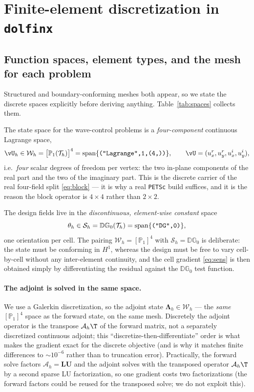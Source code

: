 \section{Finite-element discretization in \texttt{dolfinx}}
\label{sec:fem}

\subsection{Function spaces, element types, and the mesh for each problem}
\label{sec:spaces}
Structured and boundary-conforming meshes both appear, so we state the discrete
spaces explicitly before deriving anything. Table~\ref{tab:spaces}
collects them.

The state space for the wave-control problems is a \emph{four-component}
continuous Lagrange space,
\begin{equation}
  \vU_h\in\mathcal W_h=\bigl[\mathbb P_1(\mathcal T_h)\bigr]^4
  =\operatorname{span}\{\text{\texttt{("Lagrange",1,(4,))}}\},
  \qquad
  \vU=(u_x^r,u_y^r,u_x^i,u_y^i),
  \label{eq:Wspace}
\end{equation}
i.e.\ \emph{four} scalar degrees of freedom per vertex: the two in-plane
components of the real part and the two of the imaginary part. This is the
discrete carrier of the real four-field split \eqref{eq:block} --- it is why a
real \texttt{PETSc} build suffices, and it is the reason the block operator is
$4\times4$ rather than $2\times2$.

The design fields live in the \emph{discontinuous, element-wise constant} space
\begin{equation}
  \theta_h\in\mathcal S_h=\mathbb{DG}_0(\mathcal T_h)
  =\operatorname{span}\{\text{\texttt{("DG",0)}}\},
\end{equation}
one orientation per cell. The pairing
$\mathcal W_h=[\mathbb P_1]^4$ with $\mathcal S_h=\mathbb{DG}_0$ is deliberate:
the state must be conforming in $H^1$, whereas the design must be free to vary
cell-by-cell without any inter-element continuity, and the cell gradient
\eqref{eq:sens} is then obtained simply by differentiating the residual against
the $\mathbb{DG}_0$ test function.

\paragraph{The adjoint is solved in the same space.} We use a Galerkin
discretization, so the adjoint state
$\bm\Lambda_h\in\mathcal W_h$ --- the \emph{same} $[\mathbb P_1]^4$ space as the
forward state, on the same mesh. Discretely the adjoint operator is the transpose
$\mathcal A_h\T$ of the forward matrix, not a separately discretized continuous
adjoint; this ``discretize-then-differentiate'' order is what makes the gradient
exact for the discrete objective (and is why it matches finite differences to
$\sim\!10^{-6}$ rather than to truncation error). Practically, the forward solve
factors $\mathcal A_h=\mathbf{LU}$ and the adjoint solves with the transposed operator
$\mathcal A_h\T$ by a second sparse LU factorization, so one gradient costs two
factorizations (the forward factors could be reused for the transposed solve; we do not
exploit this).

